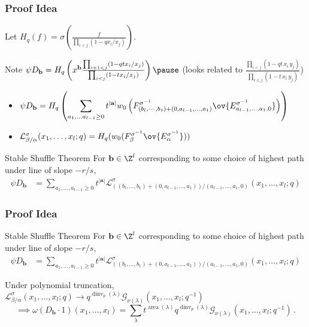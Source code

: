 \documentclass{beamer}
\DeclareMathOperator{\area}{area}
\DeclareMathOperator{\dinv}{dinv}
\newcommand{\Gcal}{\mathcal{G}}
\newcommand{\Lcal}{{\mathcal L}}
\newcommand{\bb}{{\mathbf b}}
\newcommand{\aA}{{\mathbf a}}
\newcounter{c}
\begin{document}
\begin{frame}
  \frametitle{Proof Idea}
  Let \(H_q(f) = \sigma\left(\frac{f}{\prod_{i < j}(1-q x_i/x_j)}
  \right)\).
  
Note \(\psi D_\bb = H_q\left(x^{\bb} \frac{\prod_{i+1 < j} (1-qt x_i/x_j)}{\prod_{i<j} (1-t
    x_i/x_j)} \right)\pause
\) (looks related to \(\frac{\prod _{i<j} (1 - qt\, x_{i} \, y_{j})}{\prod
          _{i\leq j} (1 - t\, x_{i}\, y_{j})} \))\pause
        \begin{itemize}
        \item \(\displaystyle \psi D_\bb = H_q \left( \sum_{a_1,\ldots
              a_{l-1} \geq 0} t^{|\aA|} w_0\left(
              F^{\sigma^{-1}}_{(b_l,\cdots,b_1)+(0,a_{l-1},\ldots,a_1)}
              \ov{E^{\sigma^{-1}}_{a_{l-1},\ldots,a_1,0}}\right)
          \right) \)\pause
         \item \(\Lcal^\sigma_{\beta/\alpha}(x_1,\ldots,x_l;q) =
          H_q(w_0(F^{\sigma^{-1}}_\beta
          \ov{E^{\sigma^{-1}}_\alpha}))\)\pause
        \end{itemize}
        \begin{block}{Stable Shuffle Theorem}
    For \(\bb \in \Z^l\) corresponding to some choice of highest path
    under line of slope \(-r/s\),
    \begin{align*}
      \psi D_\bb &= \sum_{a_1,\ldots,a_{l-1} \geq 0}
t^{|\aA|} \Lcal^\sigma_{((b_l,\ldots,b_1)+(0,a_{l-1},\ldots,a_1))/(a_{l-1},\ldots,a_1,0)}(x_1,\ldots,x_l;q)
    \end{align*}
  \end{block}
\end{frame}
\begin{frame}
  \frametitle{Proof Idea}
        \begin{block}{Stable Shuffle Theorem}
    For \(\bb \in \Z^l\) corresponding to some choice of highest path
    under line of slope \(-r/s\),
    \begin{align*}
      \psi D_\bb &= \sum_{a_1,\ldots,a_{l-1} \geq 0}
t^{|\aA|} \Lcal^\sigma_{((b_l,\ldots,b_1)+(0,a_{l-1},\ldots,a_1))/(a_{l-1},\ldots,a_1,0)}(x_1,\ldots,x_l;q)
    \end{align*}
  \end{block}\pause
    Under polynomial truncation,
  \(\Lcal^\sigma_{\beta/\alpha}(x_1,\ldots,x_l;q) \to
  q^{\dinv_p(\lambda)}\Gcal_{\nu(\lambda)}(x_1,\ldots,x_l;q^{-1})\)\pause \[
    \implies \omega(D_\bb \cdot 1)(x_1,\ldots,x_l) = \sum_\lambda
    t^{\area(\lambda)}q^{\dinv_p(\lambda)} \Gcal_{\nu(\lambda)}(x_1,\ldots,x_l;q^{-1})\,.
  \]
\end{frame}
\end{document}
